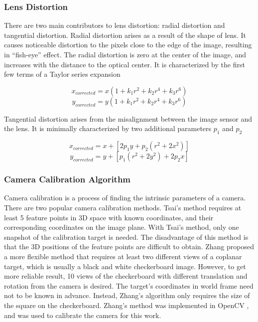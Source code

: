 \subsubsection{Lens Distortion}
There are two main contributors to lens distortion: radial distortion
and tangential distortion. Radial distortion arises as a result of the
shape of lens. It causes noticeable distortion to the pixels close to
the edge of the image, resulting in ``fish-eye'' effect. The radial
distortion is zero at the center of the image, and increases with the
distance to the optical center. It is characterized by the first few
terms of a Taylor series expansion \cite{bradski_learning_2008}

$$ x_{corrected} = x(1+k_1r^2+k_2r^4+k_3r^6)$$
$$ y_{corrected} = y(1+k_1r^2+k_2r^4+k_3r^6)$$

\noindent Tangential distortion arises from the misalignment between
the image sensor and the lens. It is minimally characterized by two
additional parameters $p_1$ and $p_2$ \cite{bradski_learning_2008}

$$x_{corrected} = x+[2p_1y+p_2(r^2+2x^2)]$$
$$y_{corrected} = y+[p_1(r^2+2y^2)+2p_2x]$$

\subsubsection{Camera Calibration Algorithm}
Camera calibration is a process of finding the intrinsic parameters of
a camera. There are two popular camera calibration methods. Tsai's method
\cite{tsai_efficient_1986} requires at least 5 feature points in 3D
space with known coordinates, and their corresponding coordinates on
the image plane. With Tsai's method, only one snapshot of the
calibration target is needed. The disadvantage of this method is that
the 3D positions of the feature points are difficult to obtain. Zhang
\cite{zhang_flexible_2000} proposed a more flexible method that
requires at least two different views of a coplanar target, which is
usually a black and white checkerboard image. However, to get more
reliable result, 10 views of the checkerboard with different
translation and rotation from the camera is desired. The target's
coordinates in world frame need not to be known in advance. Instead, Zhang's
algorithm only requires the size of the square on the checkerboard.
Zhang's method was implemented in OpenCV \cite{bradski_learning_2008},
and was used to calibrate the camera for this work.

